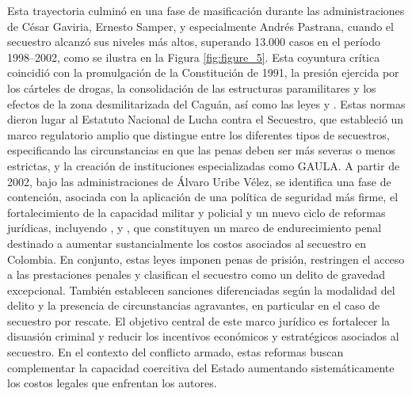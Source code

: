 \documentclass[12pt]{article}
\providecommand{\textcite}{\citet}
\theoremstyle{definition}
\theoremstyle{remark}
\newcommand{\1}{\mathbf{1}}
\begin{document}
Esta trayectoria culminó en una fase de masificación durante las administraciones de César Gaviria, Ernesto Samper, y especialmente Andrés Pastrana, cuando el secuestro alcanzó sus niveles más altos, superando 13.000 casos en el período 1998–2002, como se ilustra en la Figura \ref{fig:figure_5}. Esta coyuntura crítica coincidió con la promulgación de la Constitución de 1991, la presión ejercida por los cárteles de drogas, la consolidación de las estructuras paramilitares y los efectos de la zona desmilitarizada del Caguán, así como las leyes \textcite{ley40_1993} y \textcite{ley282_1996}. Estas normas dieron lugar al Estatuto Nacional de Lucha contra el Secuestro, que estableció un marco regulatorio amplio que distingue entre los diferentes tipos de secuestros, especificando las circunstancias en que las penas deben ser más severas o menos estrictas, y la creación de instituciones especializadas como GAULA. A partir de 2002, bajo las administraciones de Álvaro Uribe Vélez, se identifica una fase de contención, asociada con la aplicación de una política de seguridad más firme, el fortalecimiento de la capacidad militar y policial y un nuevo ciclo de reformas jurídicas, incluyendo \textcite{ley733_2002}, \textcite{ley890_2004} y \textcite{ley1200_2008}, que constituyen un marco de endurecimiento penal destinado a aumentar sustancialmente los costos asociados al secuestro en Colombia. En conjunto, estas leyes imponen penas de prisión, restringen el acceso a las prestaciones penales y clasifican el secuestro como un delito de gravedad excepcional. También establecen sanciones diferenciadas según la modalidad del delito y la presencia de circunstancias agravantes, en particular en el caso de secuestro por rescate. El objetivo central de este marco jurídico es fortalecer la disuasión criminal y reducir los incentivos económicos y estratégicos asociados al secuestro. En el contexto del conflicto armado, estas reformas buscan complementar la capacidad coercitiva del Estado aumentando sistemáticamente los costos legales que enfrentan los autores.
\end{document}
